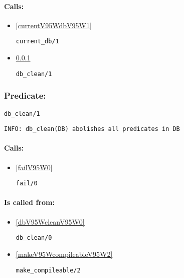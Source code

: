 \paragraph{Calls:} 
\begin{itemize}
\item \ref{currentV95WdbV95W1} 
\begin{verbatim}
current_db/1
\end{verbatim}

\item \ref{dbV95WcleanV95W1} 
\begin{verbatim}
db_clean/1
\end{verbatim}

\end{itemize}

\subsubsection{Predicate:} \label{dbV95WcleanV95W1}

\begin{verbatim}
db_clean/1
\end{verbatim}

{\small \begin{verbatim}
INFO: db_clean(DB) abolishes all predicates in DB

\end{verbatim}}
\paragraph{Calls:} 
\begin{itemize}
\item \ref{failV95W0} 
\begin{verbatim}
fail/0
\end{verbatim}

\end{itemize}
\paragraph{Is called from:} 
\begin{itemize}
\item \ref{dbV95WcleanV95W0} 
\begin{verbatim}
db_clean/0
\end{verbatim}

\item \ref{makeV95WcompileableV95W2} 
\begin{verbatim}
make_compileable/2
\end{verbatim}

\end{itemize}

